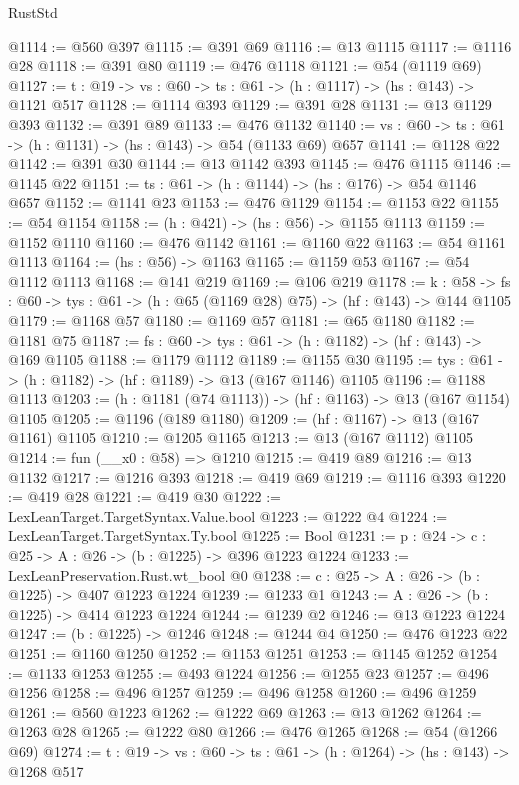 \begin{lexlean}{RustStd}
\begin{coremodule}
@1114 := @560 @397
@1115 := @391 @69
@1116 := @13 @1115
@1117 := @1116 @28
@1118 := @391 @80
@1119 := @476 @1118
@1121 := @54 (@1119 @69)
@1127 := {t : @19} -> {vs : @60} -> {ts : @61} -> (h : @1117) -> (hs : @143) -> @1121 @517
@1128 := @1114 @393
@1129 := @391 @28
@1131 := @13 @1129 @393
@1132 := @391 @89
@1133 := @476 @1132
@1140 := {vs : @60} -> {ts : @61} -> (h : @1131) -> (hs : @143) -> @54 (@1133 @69) @657
@1141 := @1128 @22
@1142 := @391 @30
@1144 := @13 @1142 @393
@1145 := @476 @1115
@1146 := @1145 @22
@1151 := {ts : @61} -> (h : @1144) -> (hs : @176) -> @54 @1146 @657
@1152 := @1141 @23
@1153 := @476 @1129
@1154 := @1153 @22
@1155 := @54 @1154
@1158 := (h : @421) -> (hs : @56) -> @1155 @1113
@1159 := @1152 @1110
@1160 := @476 @1142
@1161 := @1160 @22
@1163 := @54 @1161 @1113
@1164 := (hs : @56) -> @1163
@1165 := @1159 @53
@1167 := @54 @1112 @1113
@1168 := @141 @219
@1169 := @106 @219
@1178 := {k : @58} ->
  {fs : @60} -> {tys : @61} -> (h : @65 (@1169 @28) @75) -> (hf : @143) -> @144 @1105
@1179 := @1168 @57
@1180 := @1169 @57
@1181 := @65 @1180
@1182 := @1181 @75
@1187 := {fs : @60} -> {tys : @61} -> (h : @1182) -> (hf : @143) -> @169 @1105
@1188 := @1179 @1112
@1189 := @1155 @30
@1195 := {tys : @61} -> (h : @1182) -> (hf : @1189) -> @13 (@167 @1146) @1105
@1196 := @1188 @1113
@1203 := (h : @1181 (@74 @1113)) -> (hf : @1163) -> @13 (@167 @1154) @1105
@1205 := @1196 (@189 @1180)
@1209 := (hf : @1167) -> @13 (@167 @1161) @1105
@1210 := @1205 @1165
@1213 := @13 (@167 @1112) @1105
@1214 := fun (__x0 : @58) => @1210
@1215 := @419 @89
@1216 := @13 @1132
@1217 := @1216 @393
@1218 := @419 @69
@1219 := @1116 @393
@1220 := @419 @28
@1221 := @419 @30
@1222 := LexLeanTarget.TargetSyntax.Value.bool
@1223 := @1222 @4
@1224 := LexLeanTarget.TargetSyntax.Ty.bool
@1225 := Bool
@1231 := {p : @24} -> {c : @25} -> {A : @26} -> (b : @1225) -> @396 @1223 @1224
@1233 := LexLeanPreservation.Rust.wt_bool @0
@1238 := {c : @25} -> {A : @26} -> (b : @1225) -> @407 @1223 @1224
@1239 := @1233 @1
@1243 := {A : @26} -> (b : @1225) -> @414 @1223 @1224
@1244 := @1239 @2
@1246 := @13 @1223 @1224
@1247 := (b : @1225) -> @1246
@1248 := @1244 @4
@1250 := @476 @1223 @22
@1251 := @1160 @1250
@1252 := @1153 @1251
@1253 := @1145 @1252
@1254 := @1133 @1253
@1255 := @493 @1224
@1256 := @1255 @23
@1257 := @496 @1256
@1258 := @496 @1257
@1259 := @496 @1258
@1260 := @496 @1259
@1261 := @560 @1223
@1262 := @1222 @69
@1263 := @13 @1262
@1264 := @1263 @28
@1265 := @1222 @80
@1266 := @476 @1265
@1268 := @54 (@1266 @69)
@1274 := {t : @19} -> {vs : @60} -> {ts : @61} -> (h : @1264) -> (hs : @143) -> @1268 @517

\end{coremodule}
\end{lexlean}
